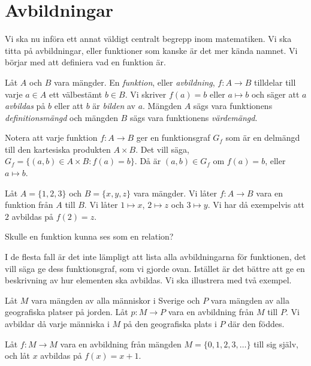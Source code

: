 \section{Avbildningar}
Vi ska nu införa ett annat väldigt centralt begrepp inom matematiken.
Vi ska titta på avbildningar, eller funktioner som kanske är det mer kända 
namnet.
Vi börjar med att definiera vad en funktion är.

\begin{definition}\label{def:Avbildning}
  Låt \(A\) och \(B\) vara mängder.
  En \emph{funktion}, eller \emph{avbildning}, \(f\colon A\to B\) tilldelar
  till varje \(a\in A\) ett välbestämt \(b\in B\).
  Vi skriver \(f(a)=b\) eller \(a\mapsto b\) och säger att \(a\)
  \emph{avbildas} på \(b\) eller att \(b\) är \emph{bilden} av \(a\).
  Mängden \(A\) sägs vara funktionens \emph{definitionsmängd} och mängden
  \(B\) sägs vara funktionens \emph{värdemängd}.
\end{definition}
\begin{remark}
  Notera att varje funktion \(f\colon A\to B\) ger en funktionsgraf \(G_f\)
  som är en delmängd till den kartesiska produkten \(A\times B\).
  Det vill säga, \(G_f = \{(a,b)\in A\times B\colon f(a)=b\}\).
  Då är \((a,b)\in G_f\) om \(f(a)=b\), eller \(a\mapsto b\).
\end{remark}
\begin{example}
  Låt \(A=\{1,2,3\}\) och \(B=\{x,y,z\}\) vara mängder.
  Vi låter \(f\colon A\to B\) vara en funktion från \(A\) till \(B\).
  Vi låter \(1\mapsto x\), \(2\mapsto z\) och \(3\mapsto y\).
  Vi har då exempelvis att \(2\) avbildas på \(f(2)=z\).
\end{example}

\begin{exercise}
  Skulle en funktion kunna ses som en relation?
\end{exercise}

I de flesta fall är det inte lämpligt att lista alla avbildningarna för
funktionen, det vill säga ge dess funktionsgraf, som vi gjorde ovan.
Istället är det bättre att ge en beskrivning av hur elementen ska avbildas.
Vi ska illustrera med två exempel.
\begin{example}
  Låt \(M\) vara mängden av alla människor i Sverige och \(P\) vara mängden
  av alla geografiska platser på jorden.
  Låt \(p\colon M\to P\) vara en avbildning från \(M\) till \(P\).
  Vi avbildar då varje människa i \(M\) på den geografiska plats i \(P\) där
  den föddes.
\end{example}
\begin{example}
  Låt \(f\colon M\to M\) vara en avbildning från mängden
  \(M=\{0,1,2,3,\ldots\}\) till sig själv, och låt \(x\) avbildas på
  \(f(x)=x+1\).
\end{example}

